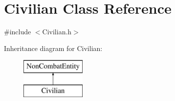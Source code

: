 \hypertarget{class_civilian}{}\section{Civilian Class Reference}
\label{class_civilian}


{\ttfamily \#include $<$Civilian.\+h$>$}

Inheritance diagram for Civilian\+:\begin{figure}[H]
\begin{center}
\leavevmode
\includegraphics[height=2.000000cm]{class_civilian}
\end{center}
\end{figure}
